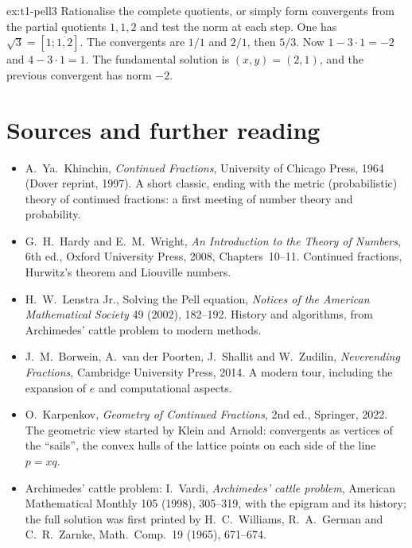 \begin{solution}{ex:t1-pell3}
\idea Rationalise the complete quotients, or simply form convergents from the partial quotients $1,1,2$ and test the norm at each step.
\writeup One has $\sqrt 3=[1;\overline{1,2}]$. The convergents are $1/1$ and $2/1$, then $5/3$. Now $1-3\cdot 1=-2$ and $4-3\cdot 1=1$. The fundamental solution is $(x,y)=(2,1)$, and the previous convergent has norm $-2$.
\end{solution}

\section*{Sources and further reading}

\begin{itemize}
\item A.~Ya.~Khinchin, \emph{Continued Fractions}, University of Chicago Press, 1964 (Dover reprint, 1997). A short classic, ending with the metric (probabilistic) theory of continued fractions: a first meeting of number theory and probability.
\item G.~H.~Hardy and E.~M.~Wright, \emph{An Introduction to the Theory of Numbers}, 6th ed., Oxford University Press, 2008, Chapters~10--11. Continued fractions, Hurwitz's theorem and Liouville numbers.
\item H.~W.~Lenstra Jr., Solving the Pell equation, \emph{Notices of the American Mathematical Society} 49 (2002), 182--192. History and algorithms, from Archimedes' cattle problem to modern methods.
\item J.~M.~Borwein, A.~van der Poorten, J.~Shallit and W.~Zudilin, \emph{Neverending Fractions}, Cambridge University Press, 2014. A modern tour, including the expansion of $e$ and computational aspects.
\item O.~Karpenkov, \emph{Geometry of Continued Fractions}, 2nd ed., Springer, 2022. The geometric view started by Klein and Arnold: convergents as vertices of the ``sails'', the convex hulls of the lattice points on each side of the line $p=xq$.
\item Archimedes' cattle problem: I.~Vardi, \emph{Archimedes' cattle problem}, American Mathematical Monthly 105 (1998), 305--319, with the epigram and its history; the full solution was first printed by H.~C.~Williams, R.~A.~German and C.~R.~Zarnke, Math.\ Comp.\ 19 (1965), 671--674.
\end{itemize}
